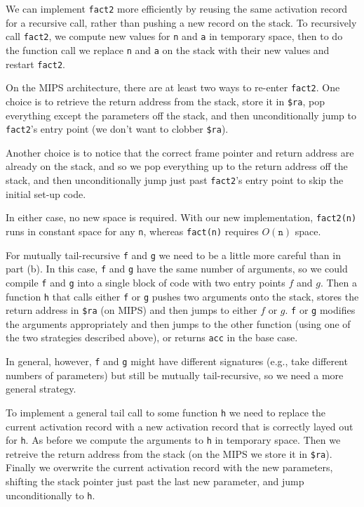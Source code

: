 \documentclass{article}
\begin{document}
\begin{enumerate}
\begin{enumerate}
We can implement \verb'fact2' more efficiently by reusing the same
activation record for a recursive call, rather than pushing a new
record on the stack.  To recursively call \verb'fact2', we compute new
values for \texttt{n} and \texttt{a} in temporary space, then to do
the function call we replace \texttt{n} and \texttt{a} on the stack
with their new values and restart \verb'fact2'.

On the MIPS architecture, there are at least two ways to re-enter
\verb'fact2'.  One choice is to retrieve the return address from the
stack, store it in \texttt{\$ra}, pop everything except the parameters
off the stack, and then unconditionally jump to \verb'fact2''s entry
point (we don't want to clobber \texttt{\$ra}).

Another choice is to notice that the correct frame pointer and return
address are already on the stack, and so we pop everything up to the
return address off the stack, and then unconditionally jump just past
\verb'fact2''s entry point to skip the initial set-up code.

In either case, no new space is required.  With our new
implementation, \verb'fact2(n)' runs in constant space for any
\texttt{n}, whereas \verb'fact(n)' requires $O(\texttt{n})$ space.


For mutually tail-recursive \texttt{f} and \texttt{g} we need to be a
little more careful than in part (b).  In this case, \texttt{f} and
\texttt{g} have the same number of arguments, so we could compile
\texttt{f} and \texttt{g} into a single block of code with two entry
points $f$ and $g$.  Then a function \texttt{h} that calls either
\texttt{f} or \texttt{g} pushes two arguments onto the stack, stores
the return address in \texttt{\$ra} (on MIPS) and then jumps to either
$f$ or $g$.  \texttt{f} or \texttt{g} modifies the arguments
appropriately and then jumps to the other function (using one of the
two strategies described above), or returns \texttt{acc} in the base
case.

In general, however, \texttt{f} and \texttt{g} might have different
signatures (e.g., take different numbers of parameters) but still be
mutually tail-recursive, so we need a more general strategy.

To implement a general tail call to some function \texttt{h} we need
to replace the current activation record with a new activation record
that is correctly layed out for \texttt{h}.  As before we compute the
arguments to \texttt{h} in temporary space.  Then we retreive the
return address from the stack (on the MIPS we store it in
\texttt{\$ra}).  Finally we overwrite the current activation record
with the new parameters, shifting the stack pointer just past the last
new parameter, and jump unconditionally to \texttt{h}.
\end{enumerate}


\end{enumerate}
\end{document}
